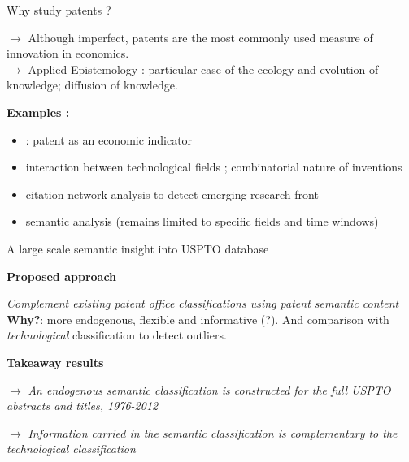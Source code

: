 \documentclass{beamer}
\begin{document}
\begin{frame}{Why study patents ?}

$\rightarrow$ Although imperfect, patents are the most commonly used measure of innovation in economics. \\ %
$\rightarrow$ Applied Epistemology : particular case of the ecology and evolution of knowledge; diffusion of knowledge.
\bigskip

\textbf{Examples :}

\begin{itemize}
\item \cite{griliches1998patent}: patent as an economic indicator
\item \cite{Youn:2015fk} interaction between technological fields ; combinatorial nature of inventions
\item \cite{2016arXiv160207928B} citation network analysis to detect emerging research front
\item \cite{gerken2012new} \cite{tseng2007text} semantic analysis (remains limited to specific fields and time windows)
\end{itemize} 

\end{frame}


\begin{frame}{A large scale semantic insight into USPTO database}
    
    
    \textbf{Proposed approach}
    
    \medskip
    
    \textit{Complement existing patent office classifications using patent semantic content} \\
    \textbf{Why?}: more endogenous, flexible and informative (?). And comparison with \emph{technological} classification to detect outliers.
    
    \bigskip
    
    \textbf{Takeaway results}
    
    \medskip
    
    $\rightarrow$ \textit{An endogenous semantic classification is constructed for the full USPTO abstracts and titles, 1976-2012}
    
    \bigskip

    $\rightarrow$ \textit{Information carried in the semantic classification is complementary to the technological classification}
    
    
\end{frame}
\end{document}
